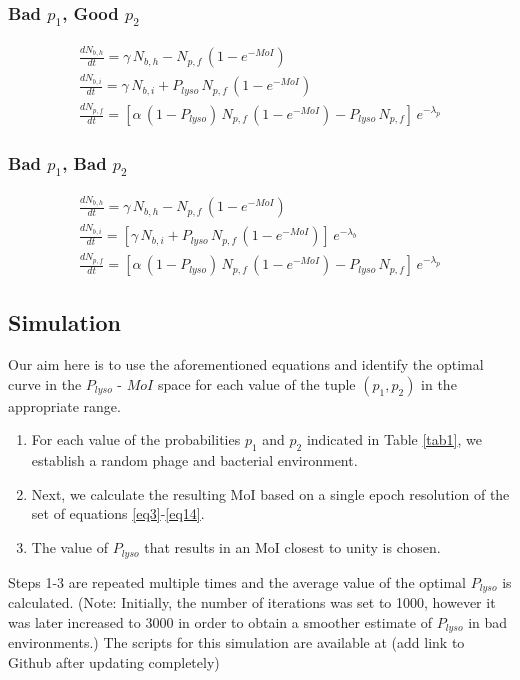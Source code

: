 \documentclass[12pt,letterpaper]{article}
\begin{document}
\subsubsection*{Bad $p_1$, Good $p_2$}
\begin{gather}
\frac{dN_{b,h}}{dt} = \gamma\,N_{b,h} - N_{p,f}\,(1-e^{-MoI}) \label{eq9} \\
\frac{dN_{b,i}}{dt} = \gamma\,N_{b,i} + P_{lyso}\,N_{p,f}\,(1-e^{-MoI}) \label{eq10} \\
\frac{dN_{p,f}}{dt} = [\alpha\,(1-P_{lyso})\,N_{p,f}\,(1-e^{-MoI}) - P_{lyso}\,N_{p,f}]\,e^{-\lambda_p} \label{eq11}
\end{gather}

\subsubsection*{Bad $p_1$, Bad $p_2$}
\begin{gather}
\frac{dN_{b,h}}{dt} = \gamma\,N_{b,h} - N_{p,f}\,(1-e^{-MoI}) \label{eq12} \\
\frac{dN_{b,i}}{dt} = [\gamma\,N_{b,i} + P_{lyso}\,N_{p,f}\,(1-e^{-MoI})]\,e^{-\lambda_b} \label{eq13} \\
\frac{dN_{p,f}}{dt} = [\alpha\,(1-P_{lyso})\,N_{p,f}\,(1-e^{-MoI}) - P_{lyso}\,N_{p,f}]\,e^{-\lambda_p} \label{eq14}
\end{gather}

\subsection*{Simulation}
Our aim here is to use the aforementioned equations and identify the optimal curve in the $P_{lyso}$ - $MoI$ space for each value of the tuple $(p_1,p_2)$ in the appropriate range. 
\begin{enumerate}
\item For each value of the probabilities $p_1$ and $p_2$ indicated in Table \ref{tab1}, we establish a random phage and bacterial environment.
\item Next, we calculate the resulting MoI based on a single epoch resolution of the set of equations \ref{eq3}-\ref{eq14}.
\item The value of $P_{lyso}$ that results in an MoI closest to unity is chosen. 
\end{enumerate}
Steps 1-3 are repeated multiple times and the average value of the optimal $P_{lyso}$ is calculated. (Note: Initially, the number of iterations was set to 1000, however it was later increased to 3000 in order to obtain a smoother estimate of $P_{lyso}$ in bad environments.) The scripts for this simulation are available at (add link to Github after updating completely)
\end{document}
